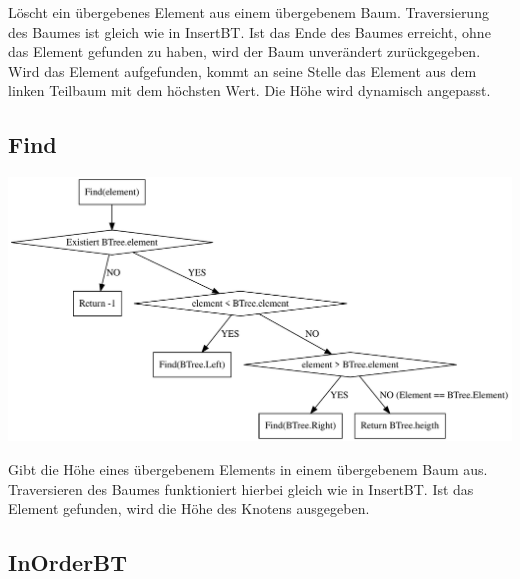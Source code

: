 \documentclass[11pt]{article}
\begin{document}
    Löscht ein übergebenes Element aus einem übergebenem Baum. Traversierung des Baumes ist gleich wie in InsertBT. Ist das Ende des Baumes erreicht, ohne das Element gefunden zu haben, wird der Baum unverändert zurückgegeben. Wird das Element aufgefunden, kommt an seine Stelle das Element aus dem linken Teilbaum mit dem höchsten Wert. Die Höhe wird dynamisch angepasst.

    \subsection{Find}

    \begin{center}
        \includegraphics[width=1.1\columnwidth] {find.pdf}
    \end{center}

    Gibt die Höhe eines übergebenem Elements in einem übergebenem Baum aus. Traversieren des Baumes funktioniert hierbei gleich wie in InsertBT. Ist das Element gefunden, wird die Höhe des Knotens ausgegeben.

    \subsection{InOrderBT}
\end{document}
